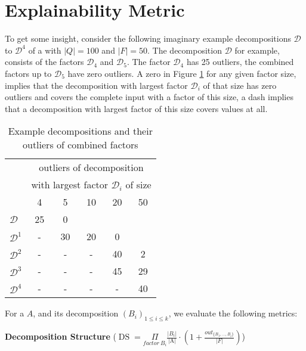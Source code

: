 \section{Explainability Metric}
\label{ch:explainability:metric}
To get some insight, consider the following imaginary example decompositions $\mathcal{D}$ to $\mathcal{D}^4$ of a \DFA with $|Q| = 100$ and $|F| = 50$.
The decomposition $\mathcal{D}$ for example, consists of the factors $\mathcal{D}_4$ and $\mathcal{D}_5$.
The factor $\mathcal{D}_4$ has 25 outliers, the combined factors up to $\mathcal{D}_5$ have zero outliers.
A zero in Figure \ref{tab:example-decompositions} for any given factor size, implies that the decomposition with largest factor $\mathcal{D}_i$ of that size has zero outliers and covers the complete input \DFA with a factor of this size, a dash implies that a decomposition with largest factor of this size covers values at all.
\begin{table}[h]
	\centering
	\begin{tabular}{l|ccccc}
		& \multicolumn{5}{c}{outliers of decomposition} \\
		& \multicolumn{5}{c}{with largest factor $\mathcal{D}_i$ of size} \\
		& 4 & 5 & 10 & 20 & 50\\
		\hline
		$\mathcal{D}$ & 25 & 0 & &  & \\		
		$\mathcal{D}^1$ & - & 30 & 20 & 0 & \\
		$\mathcal{D}^2$ & - & - & - & 40 & 2 \\
		$\mathcal{D}^3$ & - & - & - & 45 & 29 \\
		$\mathcal{D}^4$ & - & - & - & - & 40\\
	\end{tabular}
	\caption{Example decompositions and their outliers of combined factors}
	\label{tab:example-decompositions}
\end{table}
For a \DFA $A$, and its decomposition $(B_i)_{1 \leq i \leq k}$, we evaluate the following metrics:

\textbf{Decomposition Structure} ($\operatorname{DS} =  \underset{factor~ B_i}{\Pi}\frac{|B_i|}{\text{|A|}} \cdot (1 + \frac{out_{\{B_1,\dots,B_i\}}}{|F|})$)


